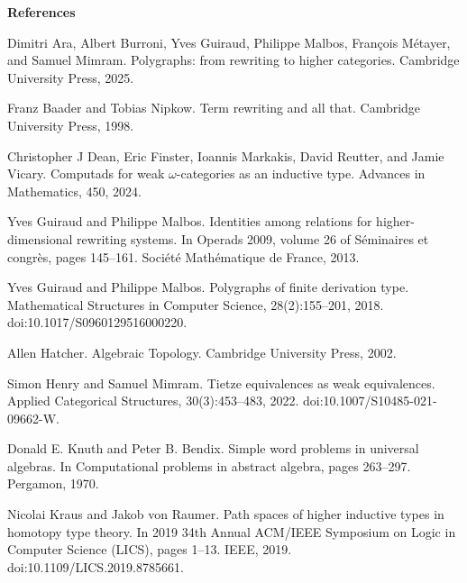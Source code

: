 
 
\par\medskip\noindent\textbf{References}\par
  
\par\noindent  [1]  Dimitri Ara, Albert Burroni, Yves Guiraud, Philippe Malbos, François Métayer, and Samuel Mimram.  Polygraphs: from rewriting to higher categories.  Cambridge University Press, 2025.  
 
\par\noindent  [2]  Franz Baader and Tobias Nipkow.  Term rewriting and all that.  Cambridge University Press, 1998.  
 
\par\noindent  [3]  Christopher J Dean, Eric Finster, Ioannis Markakis, David Reutter, and Jamie Vicary.  Computads for weak $\omega$-categories as an inductive type.  Advances in Mathematics, 450, 2024.  
 
\par\noindent  [4]  Yves Guiraud and Philippe Malbos.  Identities among relations for higher-dimensional rewriting systems.  In Operads 2009, volume 26 of Séminaires et congrès, pages 145–161. Société Mathématique de France, 2013.  
 
\par\noindent  [5]  Yves Guiraud and Philippe Malbos.  Polygraphs of finite derivation type.  Mathematical Structures in Computer Science, 28(2):155–201, 2018.  doi:10.1017/S0960129516000220.  
 
\par\noindent  [6]  Allen Hatcher.  Algebraic Topology.  Cambridge University Press, 2002.  
 
\par\noindent  [7]  Simon Henry and Samuel Mimram.  Tietze equivalences as weak equivalences.  Applied Categorical Structures, 30(3):453–483, 2022.  doi:10.1007/S10485-021-09662-W.  
 
\par\noindent  [8]  Donald E. Knuth and Peter B. Bendix.  Simple word problems in universal algebras.  In Computational problems in abstract algebra, pages 263–297. Pergamon, 1970.  
 
\par\noindent  [9]  Nicolai Kraus and Jakob von Raumer.  Path spaces of higher inductive types in homotopy type theory.  In 2019 34th Annual ACM/IEEE Symposium on Logic in Computer Science (LICS), pages 1–13. IEEE, 2019.  doi:10.1109/LICS.2019.8785661.  
 
